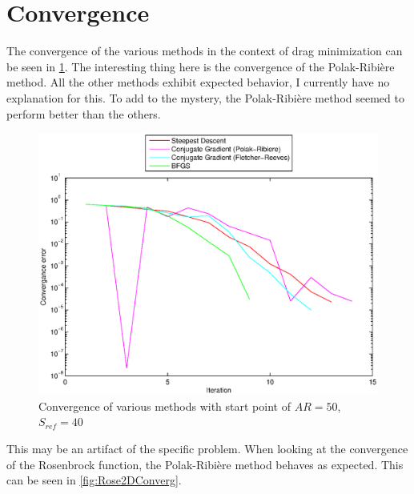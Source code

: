 \documentclass[12pt,parskip=full]{article}
\numberwithin{subsection}{section}
\begin{document}
	\section{Convergence}
		The convergence of the various methods in the context of drag minimization can be seen in \cref{fig:dragConverg1}.
		The interesting thing here is the convergence of the Polak-Ribi\`{e}re method. All the other methods
		exhibit expected behavior, I currently have no explanation for this. To add to the mystery, the Polak-Ribi\`{e}re
		method seemed to perform better than the others.
		
		\begin{figure}[!ht]
			\centering
			\includegraphics[scale=0.5]{DragConvergance.eps}
			\caption{Convergence of various methods with start point of $AR = 50$, $S_{ref} = 40$\label{fig:dragConverg1}}
		\end{figure}
	
		This may be an artifact of the specific problem. When looking at the convergence of the Rosenbrock function,
		the Polak-Ribi\`{e}re method behaves as expected. This can be seen in \cref{fig:Rose2DConverg}.
		
\end{document}

